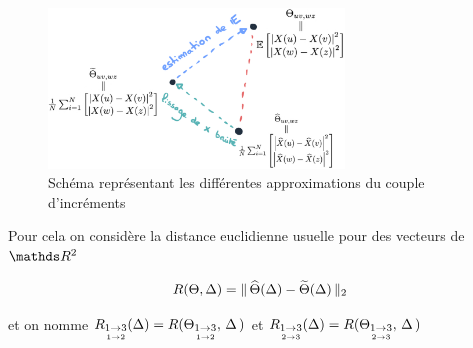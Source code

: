 \begin{figure}[H]
	\centering
	\includegraphics[width=0.7\textwidth]{Images/sketches/theta_biais.png}
	\caption{Schéma représentant les différentes approximations du couple d'incréments}
	\label{fig:sketch_theta_biais}
\end{figure}


Pour cela on considère la distance euclidienne usuelle pour des vecteurs de $\R 2$

$$R(\Theta, \Delta) = \distnorme 2 {\widehat \Theta(\Delta)} {\widetilde \Theta(\Delta)}$$

et on nomme $R\cindexA(\Delta) = R( \thetaA , \, \Delta \, )$ et $R\cindexB(\Delta) = R( \thetaB, \, \Delta \, )$

